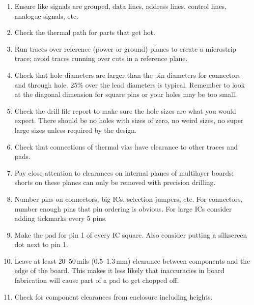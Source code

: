 \begin{enumerate}

\item Ensure like signals are grouped, data lines, address lines, control lines, analogue signals, etc.

\item Check the thermal path for parts that get hot.

\item Run traces over reference (power or ground) planes to create a
  microstrip trace; avoid traces running over cuts in a reference
  plane.

\item Check that hole diameters are larger than the pin diameters for
  connectors and through hole. 25\% over the lead diameters is
  typical.  Remember to look at the diagonal dimension for square pins
  or your holes may be too small.

\item Check the drill file report to make sure the hole sizes are what
  you would expect. There should be no holes with sizes of zero, no
  weird sizes, no super large sizes unless required by the design.

\item Check that connections of thermal vias have clearance to other
  traces and pads.

\item Pay close attention to clearances on internal planes of
  multilayer boards; shorts on these planes can only be removed with
  precision drilling.

\item Number pins on connectors, big ICs, selection jumpers, etc. For
  connectors, number enough pins that pin ordering is obvious. For
  large ICs consider adding tickmarks every 5 pins.

\item Make the pad for pin 1 of every IC square. Also consider putting
  a silkscreen dot next to pin 1.

\item Leave at least 20--50\,mils (0.5--1.3\,mm) clearance between
  components and the edge of the board. This makes it less likely that
  inaccuracies in board fabrication will cause part of a pad to get
  chopped off.

\item Check for component clearances from enclosure including heights.


\end{enumerate}
